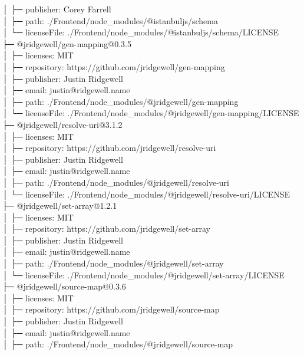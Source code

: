 │  ├─ publisher: Corey Farrell\\
│  ├─ path: ./Frontend/node\_modules/@istanbuljs/schema\\
│  └─ licenseFile: ./Frontend/node\_modules/@istanbuljs/schema/LICENSE\\
├─ @jridgewell/gen-mapping@0.3.5\\
│  ├─ licenses: MIT\\
│  ├─ repository: https://github.com/jridgewell/gen-mapping\\
│  ├─ publisher: Justin Ridgewell\\
│  ├─ email: justin@ridgewell.name\\
│  ├─ path: ./Frontend/node\_modules/@jridgewell/gen-mapping\\
│  └─ licenseFile: ./Frontend/node\_modules/@jridgewell/gen-mapping/LICENSE\\
├─ @jridgewell/resolve-uri@3.1.2\\
│  ├─ licenses: MIT\\
│  ├─ repository: https://github.com/jridgewell/resolve-uri\\
│  ├─ publisher: Justin Ridgewell\\
│  ├─ email: justin@ridgewell.name\\
│  ├─ path: ./Frontend/node\_modules/@jridgewell/resolve-uri\\
│  └─ licenseFile: ./Frontend/node\_modules/@jridgewell/resolve-uri/LICENSE\\
├─ @jridgewell/set-array@1.2.1\\
│  ├─ licenses: MIT\\
│  ├─ repository: https://github.com/jridgewell/set-array\\
│  ├─ publisher: Justin Ridgewell\\
│  ├─ email: justin@ridgewell.name\\
│  ├─ path: ./Frontend/node\_modules/@jridgewell/set-array\\
│  └─ licenseFile: ./Frontend/node\_modules/@jridgewell/set-array/LICENSE\\
├─ @jridgewell/source-map@0.3.6\\
│  ├─ licenses: MIT\\
│  ├─ repository: https://github.com/jridgewell/source-map\\
│  ├─ publisher: Justin Ridgewell\\
│  ├─ email: justin@ridgewell.name\\
│  ├─ path: ./Frontend/node\_modules/@jridgewell/source-map\\
